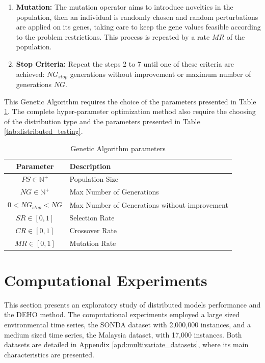 \begin{enumerate}
    \item \textbf{Mutation:} The mutation operator aims to introduce novelties in the population, then an individual is randomly chosen and random perturbations are applied on its genes, taking care to keep the gene values feasible according to the problem restrictions. This process is repeated by a rate $MR$ of the population.

    \item \textbf{Stop Criteria:} Repeat the steps 2 to 7 until one of these criteria are achieved: $NG_{stop}$ generations without improvement or maximum number of generations $NG$.
\end{enumerate}

This Genetic Algorithm requires the choice of the  parameters presented in Table \ref{tab:genetic_algoritm}. The complete hyper-parameter optimization method also require the choosing of the distribution type and the parameters presented in Table \ref{tab:distributed_testing}.

\begin{table}[htb]
    \centering
    \begin{tabular}{|c|p{7cm}|} \hline
        \textbf{Parameter} & \textbf{Description}  \\ \hline
         $PS \in \mathbb{N}^+$ & Population Size \\ \hline
         $NG \in \mathbb{N}^+$ & Max Number of Generations \\ \hline 
         $0 < NG_{stop} < NG$ & Max Number of Generations without improvement \\ \hline 
         $SR \in [0,1]$ & Selection Rate \\ \hline 
         $CR \in [0,1]$ & Crossover Rate \\ \hline 
         $MR \in [0,1]$ & Mutation Rate \\ \hline 
    \end{tabular}
    \caption{Genetic Algorithm parameters}
    \label{tab:genetic_algoritm}
\end{table}

\section{Computational Experiments}
\label{sec:scalability_experiments}

This section presents an exploratory study of distributed models performance and the DEHO method. The computational experiments employed a large sized environmental time series, the SONDA dataset with 2,000,000 instances, and a medium sized time series, the Malaysia dataset, with 17,000 instances. Both datasets are detailed in Appendix \ref{apd:multivariate_datasets}, where its main characteristics are presented.

